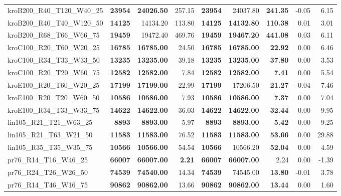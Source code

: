 \documentclass{singlecol-new}
\begin{document}
\begin{scriptsize}
\begin{longtable}{lrrrrrrrr}
		kroB200\_R40\_T120\_W40\_25 & \textbf{23954} & \textbf{24026.50} & 257.15 & \textbf{23954} & 24037.80 & \textbf{241.35} & -0.05 & 6.15 \\
		kroB200\_R40\_T40\_W120\_50 & \textbf{14125} & 14134.20 & 113.80 & \textbf{14125} & \textbf{14132.80} & \textbf{110.38} & 0.01 & 3.01 \\
		kroB200\_R68\_T66\_W66\_75 & \textbf{19459} & 19472.40 & 469.76 & \textbf{19459} & \textbf{19467.20} & \textbf{441.08} & 0.03 & 6.11 \\
		kroC100\_R20\_T60\_W20\_25 & \textbf{16785} & \textbf{16785.00} & 24.50 & \textbf{16785} & \textbf{16785.00} & \textbf{22.92} & 0.00 & 6.46 \\
		kroC100\_R34\_T33\_W33\_50 & \textbf{13235} & \textbf{13235.00} & 39.18 & \textbf{13235} & \textbf{13235.00} & \textbf{37.80} & 0.00 & 3.53 \\
		kroC100\_R20\_T20\_W60\_75 & \textbf{12582} & \textbf{12582.00} & 7.84 & \textbf{12582} & \textbf{12582.00} & \textbf{7.41} & 0.00 & 5.54 \\
		kroE100\_R20\_T60\_W20\_25 & \textbf{17199} & \textbf{17199.00} & 22.99 & \textbf{17199} & 17206.50 & \textbf{21.27} & -0.04 & 7.46 \\
		kroE100\_R20\_T20\_W60\_50 & \textbf{10586} & \textbf{10586.00} & 7.93 & \textbf{10586} & \textbf{10586.00} & \textbf{7.37} & 0.00 & 7.04 \\
		kroE100\_R34\_T33\_W33\_75 & \textbf{14622} & \textbf{14622.00} & 36.03 & \textbf{14622} & \textbf{14622.00} & \textbf{32.44} & 0.00 & 9.95 \\
		lin105\_R21\_T21\_W63\_25 & \textbf{8893} & \textbf{8893.00} & 5.97 & \textbf{8893} & \textbf{8893.00} & \textbf{5.42} & 0.00 & 9.25 \\
		lin105\_R21\_T63\_W21\_50 & \textbf{11583} & \textbf{11583.00} & 76.52 & \textbf{11583} & \textbf{11583.00} & \textbf{53.66} & 0.00 & 29.88 \\
		lin105\_R35\_T35\_W35\_75 & \textbf{10566} & \textbf{10566.00} & 54.54 & \textbf{10566} & 10566.20 & \textbf{52.04} & 0.00 & 4.59 \\
		pr76\_R14\_T16\_W46\_25 & \textbf{66007} & \textbf{66007.00} & \textbf{2.21} & \textbf{66007} & \textbf{66007.00} & 2.24 & 0.00 & -1.39 \\
		pr76\_R24\_T26\_W26\_50 & \textbf{74539} & \textbf{74540.00} & 14.34 & \textbf{74539} & 74545.00 & \textbf{13.80} & -0.01 & 3.78 \\
		pr76\_R14\_T46\_W16\_75 & \textbf{90862} & \textbf{90862.00} & 13.66 & \textbf{90862} & \textbf{90862.00} & \textbf{13.44} & 0.00 & 1.60 \\

\end{longtable}
\end{scriptsize}
\end{document}
